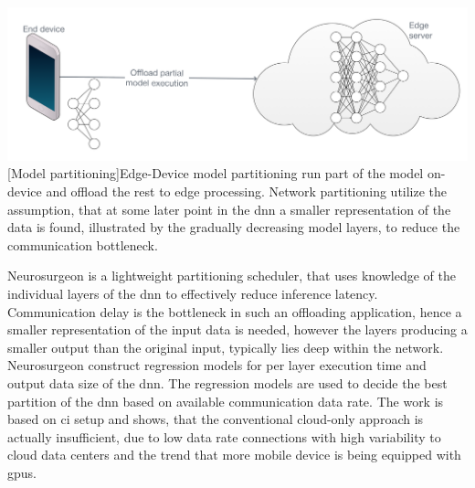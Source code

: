 \begin{minipage}[t]{\linewidth}    
	\centering
	\includegraphics[width=\linewidth]{figures/models/partitioning}
	[Model partitioning]{Edge-Device model partitioning run part of the model on-device and offload the rest to edge processing. Network partitioning utilize the assumption, that at some later point in the \gls{dnn} a smaller representation of the data is found, illustrated by the gradually decreasing model layers, to reduce the communication bottleneck. }
	\label{fig:offlaoding}
\end{minipage}

Neurosurgeon \cite{kang_neurosurgeon:_2017} is a lightweight partitioning scheduler, that uses knowledge of the individual layers of the \gls{dnn} to effectively reduce inference latency. Communication delay is the bottleneck in such an offloading application, hence a smaller representation of the input data is needed, however the layers producing a smaller output than the original input, typically lies deep within the network. Neurosurgeon construct regression models for per layer execution time and output data size of the \gls{dnn}. The regression models are used to decide the best partition of the \gls{dnn} based on available communication data rate. The work is based on \gls{ci} setup and shows, that the conventional cloud-only approach is actually insufficient, due to low data rate connections with high variability to cloud data centers and the trend that more mobile device is being equipped with \gls{gpu}s. 



